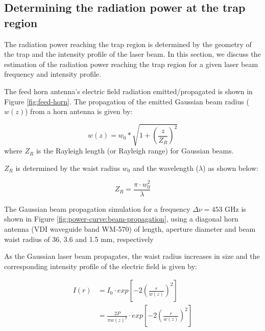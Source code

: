 \subsection{Determining the radiation power at the trap region}
\label{subsec:rot:power}

The radiation power reaching the trap region is determined by the geometry of the trap 
and the intensity profile of the laser beam. In this section, we discuss the
estimation of the radiation power reaching the trap region for a given laser beam
frequency and intensity profile.



The feed horn antenna's electric field radiation emitted/propagated is shown in
Figure \ref{fig:feed-horn}. The propagation of the emitted Gaussian beam radius
($w(z)$) from a horn antenna is given by:



\begin{equation}
    w(z) = w_0 * \sqrt{1 + \left( \frac{z}{Z_R} \right) ^2}
    \label{eqn:beam-propagation}
\end{equation}
where $Z_R$ is the Rayleigh length (or Rayleigh range) for Gaussian beams.

$Z_R$  is determined by the waist radius $w_0$ and the wavelength ($\lambda$) as shown below:

\[Z_R = \frac{\pi \cdot w_0^2}{\lambda}\]

The Gaussian beam propagation simulation for a frequency $\Delta \nu = 453$ GHz is
shown in Figure \ref{fig:power-curve:beam-propagation}, 
using a diagonal horn antenna (VDI waveguide band WM-570) of length, 
aperture diameter and beam waist radius of 36, 3.6 and 1.5 mm, respectively



As the Gaussian laser beam propagates, the waist radius increases in size and
the corresponding intensity profile of the electric field is given by:

\begin{equation}
    \begin{split}
        I(r) & = I_0 \cdot exp \left[ -2 \left (\frac{r}{w(z)}\right ) ^2\right] \\
        & = \frac{2P}{\pi w(z)^2}
        \cdot exp \left[ -2 \left (\frac{r}{w(z)}\right ) ^2\right]
    \end{split}
    \label{eqn:beam-propagation:intensity}
\end{equation}

